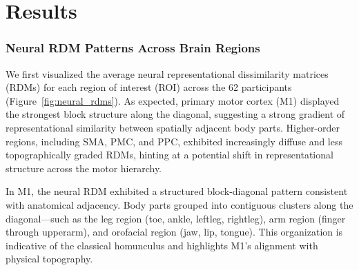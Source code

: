 \documentclass{article}
\begin{document}
% 


\section{Results}
\subsubsection{Neural RDM Patterns Across Brain Regions}
We first visualized the average neural representational dissimilarity matrices (RDMs) for each region of interest (ROI) across the 62 participants (Figure~\ref{fig:neural_rdms}). As expected, primary motor cortex (M1) displayed the strongest block structure along the diagonal, suggesting a strong gradient of representational similarity between spatially adjacent body parts. Higher-order regions, including SMA, PMC, and PPC, exhibited increasingly diffuse and less topographically graded RDMs, hinting at a potential shift in representational structure across the motor hierarchy.

In M1, the neural RDM exhibited a structured block-diagonal pattern consistent with anatomical adjacency. Body parts grouped into contiguous clusters along the diagonal—such as the leg region (toe, ankle, leftleg, rightleg), arm region (finger through upperarm), and orofacial region (jaw, lip, tongue). This organization is indicative of the classical homunculus and highlights M1's alignment with physical topography.
\end{document}
